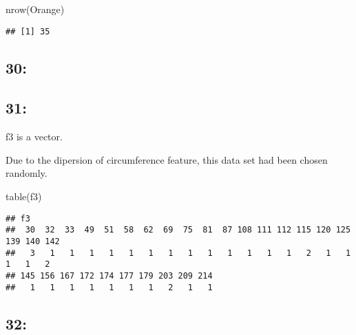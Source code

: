 \documentclass[
]{article}
\newenvironment{Shaded}{\begin{snugshade}}{\end{snugshade}}
\newcommand{\DecValTok}[1]{\textcolor[rgb]{0.00,0.00,0.81}{#1}}
\newcommand{\FunctionTok}[1]{\textcolor[rgb]{0.00,0.00,0.00}{#1}}
\newcommand{\NormalTok}[1]{#1}
\newcommand{\OtherTok}[1]{\textcolor[rgb]{0.56,0.35,0.01}{#1}}
\newcommand{\SpecialCharTok}[1]{\textcolor[rgb]{0.00,0.00,0.00}{#1}}
\begin{document}
\begin{Shaded}
\begin{Highlighting}[]
\FunctionTok{nrow}\NormalTok{(Orange)}
\end{Highlighting}
\end{Shaded}

\begin{verbatim}
## [1] 35
\end{verbatim}

\hypertarget{section-29}{%
\subsection{30:}\label{section-29}}

\begin{Shaded}
\end{Shaded}

\hypertarget{section-30}{%
\subsection{31:}\label{section-30}}

f3 is a vector.

Due to the dipersion of circumference feature, this data set had been
chosen randomly.

\begin{Shaded}
\begin{Highlighting}[]
\FunctionTok{table}\NormalTok{(f3)}
\end{Highlighting}
\end{Shaded}

\begin{verbatim}
## f3
##  30  32  33  49  51  58  62  69  75  81  87 108 111 112 115 120 125 139 140 142 
##   3   1   1   1   1   1   1   1   1   1   1   1   1   1   2   1   1   1   1   2 
## 145 156 167 172 174 177 179 203 209 214 
##   1   1   1   1   1   1   1   2   1   1
\end{verbatim}

\hypertarget{section-31}{%
\subsection{32:}\label{section-31}}
\end{document}
